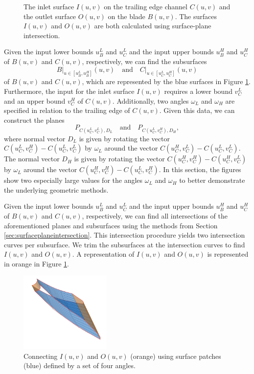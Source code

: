 \documentclass[a4paper, 11pt]{report}
\theoremstyle{definition}
\newcommand{\domrestr}{\big|}
\begin{document}
\begin{figure}[H]
\begin{subfigure}{.45\textwidth}
		\end{subfigure}
		\caption{The inlet surface $I(u,v)$ on the trailing edge channel $C(u,v)$ and the outlet surface $O(u,v)$ on the blade $B(u,v)$. The surfaces $I(u,v)$ and $O(u,v)$ are both calculated using surface-plane intersection.}
		\label{fig:slot_plane_intersection}
	\end{figure}

	Given the input lower bounds $u_B^L$ and $u_C^L$ and the input upper bounds $u_B^H$ and $u_C^H$ of $B(u,v)$ and $C(u,v)$, respectively, we can find the subsurfaces
		$$ B\domrestr_{u \in [u_B^L, u_B^H]}(u,v) \quad\text{and}\quad C\domrestr_{u \in [u_C^L, u_C^H]}(u,v)$$
	of $B(u,v)$ and $C(u,v)$, which are represented by the blue surfaces in Figure \ref{fig:slot_plane_intersection}.
	Furthermore, the input for the inlet surface $I(u,v)$ requires a lower bound $v_C^L$ and an upper bound $v_C^H$ of $C(u,v)$. Additionally, two angles $\omega_L$ and $\omega_H$ are specified in relation to the trailing edge of $C(u,v)$. Given this data, we can construct the planes
		$$ P_{C(u_C^L,v_C^L), D_L} \quad\text{and}\quad P_{C(u_C^L, v_C^H), D_H},$$
	where normal vector $D_L$ is given by rotating the vector $C(u_C^L, v_C^H)-C(u_C^L, v_C^L)$ by $\omega_L$ around the vector $C(u_C^H, v_C^L) - C(u_C^L, v_C^L)$. The normal vector $D_H$ is given by rotating the vector $C(u_C^H, v_C^H)-C(u_C^H, v_C^L)$ by $\omega_L$ around the vector $C(u_C^H, v_C^H) - C(u_C^L, v_C^H)$. In this section, the figures show two especially large values for the angles $\omega_L$ and $\omega_H$ to better demonstrate the underlying geometric methods.

	Given the input lower bounds $u_B^L$ and $u_C^L$ and the input upper bounds $u_B^H$ and $u_C^H$ of $B(u,v)$ and $C(u,v)$, respectively, we can find all intersections of the aforementioned planes and subsurfaces using the methods from Section \ref{sec:surfaceplaneintersection}. This intersection procedure yields two intersection curves per subsurface. We trim the subsurfaces at the intersection curves to find $I(u,v)$ and $O(u,v)$. A representation of $I(u,v)$ and $O(u,v)$ is represented in orange in Figure \ref{fig:slot_plane_intersection}.

	\begin{figure}[H]
		\centering
		\includegraphics[width=0.4\textwidth]{../tec/slots/16.png}
		\caption{Connecting $I(u,v)$ and $O(u,v)$ (orange) using surface patches (blue) defined by a set of four angles.}
		\label{fig:slot_connection}
	\end{figure}
\end{document}
